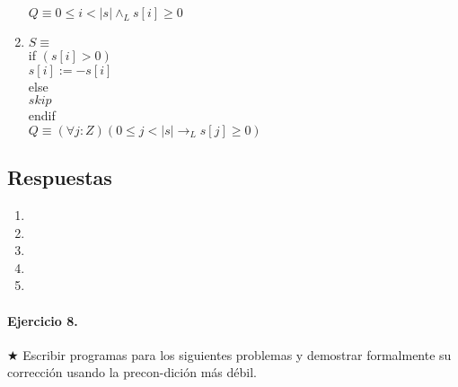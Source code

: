 \documentclass{article}
\begin{document}
\begin{enumerate}[label=\alph*)]
   $Q \equiv 0 \leq i < |s| \wedge_L s[i] \geq 0$\\
\item $S \equiv$\\
   if $( s [ i ] > 0 )$\\
      $s [ i ] := -s [ i ]$\\
   else\\
      $skip$\\
   endif\\

   $Q \equiv (\forall j :Z)(0 \leq j < |s| \rightarrow_L s[j] \geq 0)$
\end{enumerate}

\subsection*{Respuestas}

\begin{enumerate}[label=\alph*)]
	\item
	\item
	\item
	\item
	\item
\end{enumerate}
                                                          
\paragraph{Ejercicio 8.} $\bigstar$ Escribir programas para los siguientes problemas y demostrar 
formalmente su corrección usando la precon-dición más débil.
\end{document}
